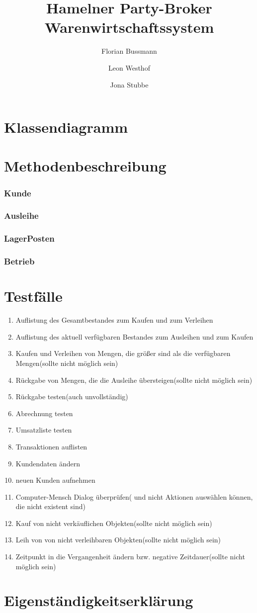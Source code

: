 \documentclass[a4paper,12pt]{article}
\title{Hamelner Party-Broker Warenwirtschaftssystem}
\author{Florian Bussmann \and Leon Westhof \and Jona Stubbe}
\begin{document}
\maketitle
\tableofcontents
\part{Klassendiagramm}
\part{Methodenbeschreibung}
\section{Kunde}
\section{Ausleihe}
\section{LagerPosten}
\section{Betrieb}
\part{Testfälle}
\begin{enumerate}
\item
Auflistung des Gesamtbestandes zum Kaufen und zum Verleihen 
\item
Auflistung des aktuell verfügbaren Bestandes zum Ausleihen und zum Kaufen
\item
Kaufen und Verleihen von Mengen, die größer sind als die verfügbaren Mengen(sollte nicht möglich sein)
\item
Rückgabe von Mengen, die die Ausleihe übersteigen(sollte nicht möglich sein)
\item
Rückgabe testen(auch unvollständig)
\item
Abrechnung testen
\item
Umsatzliste testen
\item
Transaktionen auflisten
\item
Kundendaten ändern 
\item
neuen Kunden aufnehmen
\item
Computer-Mensch Dialog überprüfen( und nicht Aktionen auswählen können, die nicht existent sind)
\item
Kauf von nicht verkäuflichen Objekten(sollte nicht möglich sein)
\item
Leih von von nicht verleihbaren Objekten(sollte nicht möglich sein)
\item
Zeitpunkt in die Vergangenheit ändern bzw. negative Zeitdauer(sollte nicht möglich sein)

\end{enumerate}
\part{Eigenständigkeitserklärung}
\end{document}
